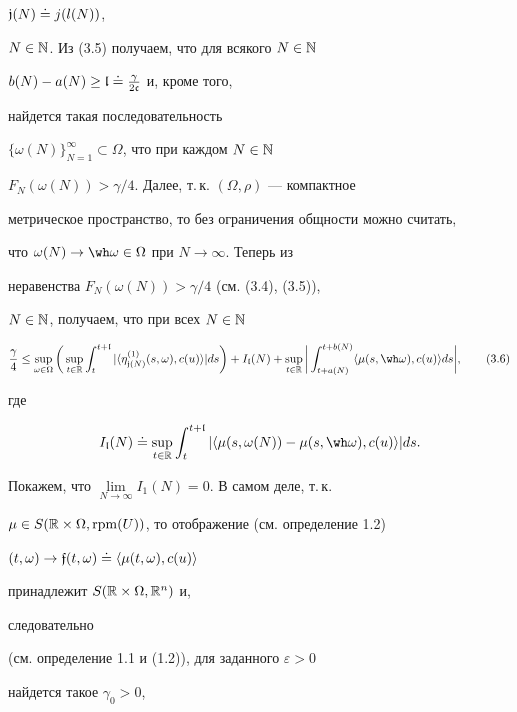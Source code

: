 ${\frak j(N)}\doteq j(l(N))$,


$N\in \Bbb N$. Из (3.5) получаем, что для всякого $N\in \Bbb N$\;


$b(N)-a(N)\ge \frak l\doteq\frac{\gamma}{2\frak c}$ и, кроме того,


найдется такая последовательность


$\{\omega(N)\}_{N=1}^{\infty}\subset\Omega$, что при каждом $N\in\Bbb N$\;


$F_{N}(\omega(N))>\gamma/4$. Далее, т.\,к. $(\Omega,\rho)$ --- компактное


метрическое пространство, то без ограничения общности можно считать,


что $\omega(N)\to\wh\omega\in\Omega$ при $N\to\infty$. Теперь из


неравенства $F_{N}(\omega(N))>\gamma/4$ (см. (3.4), (3.5)),


$N\in\Bbb N$, получаем, что при всех $N\in\Bbb N$


\begin{equation}


\frac{\gamma}{4}\le \sup\limits_{\mm}


\bigg(\sup\limits_{t\in\Bbb R}\int_t^{t+\frak l}


|\langle\eta_{\frak j(N)}^{(1)}(s,\omega),c(u)\rangle| ds\bigg)+


I_{\frak l}(N)+ \sup\limits_{t\in\Bbb R}\bigg|\int_{t+a(N)}^{t+b(N)}\la


\mu(s,\wh\omega),c(u)\ra ds\bigg|,\tag{3.6}


\end{equation}


где


$$


I_{\frak l}(N)\doteq\sup\limits_{t\in \Bbb R}\int_{t}^{t+\frak l}


|\la\mu(s,\omega(N))-\mu(s,\wh\omega),c(u)\ra| ds.


$$


Покажем, что $\lim\limits_{N\to\infty}I_1(N)=0$. В самом деле, т.\,к.


$\mu\in S(\Bbb R\times\Omega,\operatorname{rpm}(U))$, то отображение (см. определение 1.2)


$(t,\omega)\to\frak f(t,\omega)\doteq\langle\mu(t,\omega),c(u)\rangle$


принадлежит $S(\Bbb R\times\Omega,\Bbb R^n)$ и,


следовательно


(см. определение 1.1 и (1.2)), для заданного $\varepsilon>0$


найдется такое $\gamma_0>0$,


